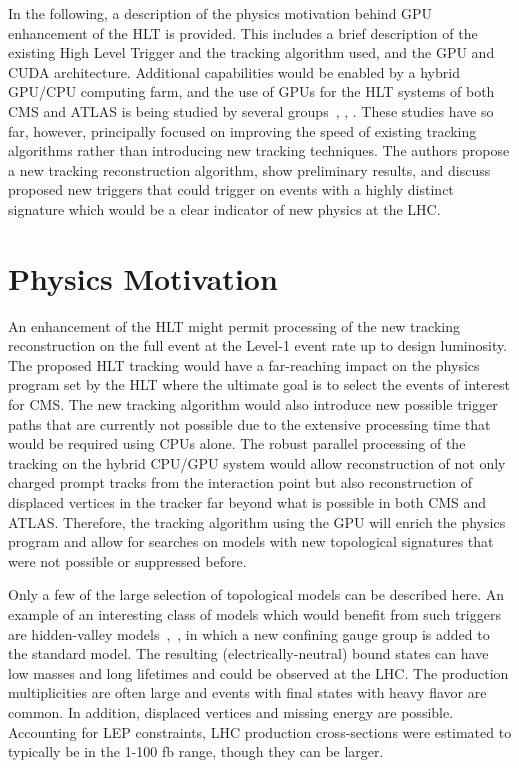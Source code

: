 \documentclass{JINST}
\begin{document}
In the following, a description of the physics motivation behind GPU enhancement of the HLT is provided.  This
includes a brief description of the existing High Level Trigger and the tracking algorithm used, and the GPU
and CUDA architecture.  Additional capabilities would be enabled by a hybrid GPU/CPU computing farm, and the
use of GPUs for the HLT systems of both CMS and ATLAS is being studied by several
groups~\cite{Emeliyanov:2012mg}, \cite{Mattmann:2012hi}, \cite{Clark:2011zzb}. These studies have so far,
however, principally focused on improving the speed of existing tracking algorithms rather than introducing
new tracking techniques.  The authors propose a new tracking reconstruction algorithm, show preliminary
results, and discuss proposed new triggers that could trigger on events with a highly distinct signature which
would be a clear indicator of new physics at the LHC.


\section{Physics Motivation}

An enhancement of the HLT might permit processing of the new tracking reconstruction on the full event 
at the Level-1 event rate up to design luminosity. The proposed HLT tracking would have a far-reaching impact on the physics program 
set by the HLT where the ultimate goal is to select the events of interest for CMS.
The new tracking algorithm would also introduce new possible trigger paths that are currently not possible due to the extensive
 processing time that would be required using CPUs alone. The robust parallel processing of the tracking on the 
hybrid CPU/GPU system would allow reconstruction of not only charged prompt tracks from the interaction point
but also reconstruction of displaced vertices in the tracker far beyond what is possible in both CMS and ATLAS.
Therefore, the tracking algorithm using the GPU will enrich the physics program and allow for searches on models with new topological signatures that were not possible or suppressed before.

Only a few of the large selection of topological models can be described here. An example of an
interesting class of models which would benefit from such triggers are hidden-valley models~\cite{bib:hiddenvalley},~\cite{Han:2007ae},
in which a new confining gauge group is added to the standard model. The resulting (electrically-neutral) bound states can have
 low masses and long lifetimes and could be observed at the LHC. The production multiplicities are often large and events with final states with heavy flavor are
common. In addition, displaced vertices and missing energy are possible. Accounting for LEP constraints, LHC production 
cross-sections were estimated to typically be in the 1-100 fb range, though they can be larger.
\end{document}

